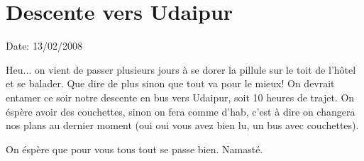 \section{Descente vers Udaipur}

Date: 13/02/2008

\begin{multicols}{2}

Heu... on vient de passer plusieurs jours à se dorer la pillule sur le toit de l'hôtel et se balader. Que dire de plus sinon que tout va pour le mieux! On devrait entamer ce soir notre descente en bus vers Udaipur, soit 10 heures de trajet. On éspère avoir des couchettes, sinon on fera comme d'hab, c'est à dire on changera nos plans au dernier moment (oui oui vous avez bien lu, un bus avec couchettes).

On éspère que pour vous tous tout se passe bien. Namasté.

\end{multicols}

